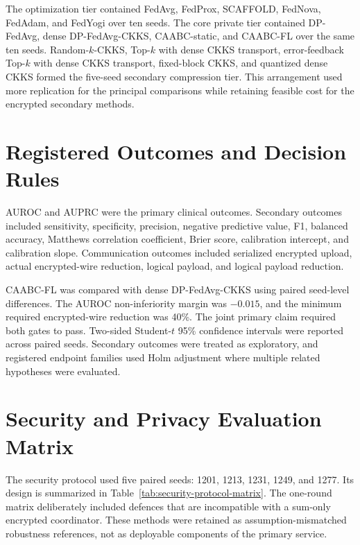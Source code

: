 The optimization tier contained FedAvg, FedProx, SCAFFOLD, FedNova, FedAdam, and FedYogi over ten seeds. The core private tier contained DP-FedAvg, dense DP-FedAvg-CKKS, CAABC-static, and CAABC-FL over the same ten seeds. Random-$k$-CKKS, Top-$k$ with dense CKKS transport, error-feedback Top-$k$ with dense CKKS transport, fixed-block CKKS, and quantized dense CKKS formed the five-seed secondary compression tier. This arrangement used more replication for the principal comparisons while retaining feasible cost for the encrypted secondary methods.

\section{Registered Outcomes and Decision Rules}
\label{appsec:outcomes-rules}

AUROC and AUPRC were the primary clinical outcomes. Secondary outcomes included sensitivity, specificity, precision, negative predictive value, F1, balanced accuracy, Matthews correlation coefficient, Brier score, calibration intercept, and calibration slope. Communication outcomes included serialized encrypted upload, actual encrypted-wire reduction, logical payload, and logical payload reduction.

CAABC-FL was compared with dense DP-FedAvg-CKKS using paired seed-level differences. The AUROC non-inferiority margin was $-0.015$, and the minimum required encrypted-wire reduction was 40\%. The joint primary claim required both gates to pass. Two-sided Student-$t$ 95\% confidence intervals were reported across paired seeds. Secondary outcomes were treated as exploratory, and registered endpoint families used Holm adjustment where multiple related hypotheses were evaluated.

\section{Security and Privacy Evaluation Matrix}
\label{appsec:security-protocol}

The security protocol used five paired seeds: 1201, 1213, 1231, 1249, and 1277. Its design is summarized in Table~\ref{tab:security-protocol-matrix}. The one-round matrix deliberately included defences that are incompatible with a sum-only encrypted coordinator. These methods were retained as assumption-mismatched robustness references, not as deployable components of the primary service.

